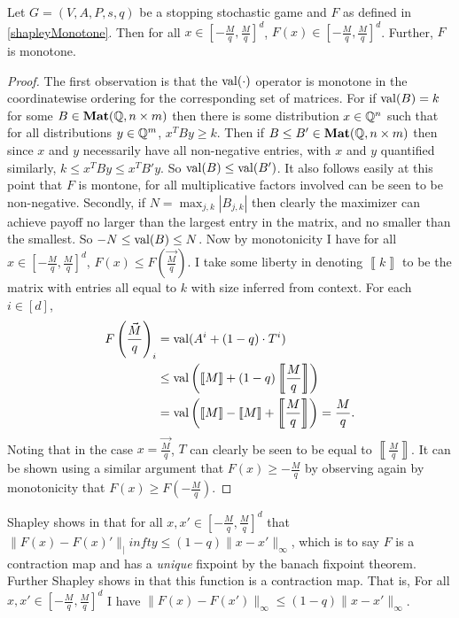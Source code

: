 \begin{lemma}
  Let $G = (V, A, P, s, q)$ be a stopping stochastic game and $F$ as defined in \cref{shapleyMonotone}.
  Then for all $x \in [-\frac{M}{q}, \frac{M}{q}]^d$, $F(x) \in [-\frac{M}{q}, \frac{M}{q}]^d$.
  Further, $F$ is monotone.
\end{lemma}
\newcommand{\mat}[1]{\left\llbracket #1 \right\rrbracket}
\begin{proof}
  The first observation is that the $\mathrm{val}(\cdot)$ operator is monotone in the coordinatewise ordering
  for the corresponding set of matrices. For
  if $\mathrm{val}(B) = k$ for some $B \in \mathbf{Mat}(\mathbb{Q}, n \times m)$ then there is some
  distribution $x \in \mathbb{Q}^n$ such that for all distributions $y \in \mathbb{Q}^m$, $x^T B y \geq k$.
  Then if $B \leq B' \in \mathbf{Mat}(\mathbb{Q}, n \times m)$ then since $x$ and $y$ necessarily have
  all non-negative entries, with $x$ and $y$ quantified similarly, $k \leq x^T B y \leq x^T B' y$. So $\mathrm{val}(B) \leq \mathrm{val}(B')$.
  It also follows easily at this point that $F$ is montone, for all multiplicative factors involved can be seen to be
  non-negative.
  Secondly, if $N = \max_{j, k} |B_{j, k}|$ then clearly the maximizer can achieve payoff
  no larger than the largest entry in the matrix, and no smaller than the smallest. So $-N \leq \mathrm{val}(B) \leq N$.
  Now by monotonicity I have for all $x \in [-\frac{M}{q}, \frac{M}{q}]^d$, $F(x) \leq F\left(\vec{\frac{M}{q}}\right)$.
  I take some liberty in denoting $\mat{k}$ to be the matrix
  with entries all equal to $k$ with size inferred from context. For each $i \in [d]$,
  \begin{align*}
    F\left(\vec{\frac{M}{q}}\right)_i &= \val(A^i + (1 - q) \cdot T^i) \\
                               &\leq \val\left(\mat{M} + (1 - q) \mat{\frac{M}{q}}\right) \\
                               &= \val\left(\mat{M} - \mat{M} + \mat{\frac{M}{q}}\right) = \frac{M}{q}.
  \end{align*}
  Noting that in the case $x = \vec{\frac{M}{q}}$, $T$ can clearly be seen to be equal to $\mat{\frac{M}{q}}$.
  It can be shown using a similar argument that $F(x) \geq -\frac{M}{q}$ by observing again by monotonicity
  that $F(x) \geq F\left(-\frac{M}{q}\right)$.
\end{proof}
Shapley shows in \citep{shapley} that for all $x, x' \in [-\frac{M}{q}, \frac{M}{q}]^d$ 
that $\|F(x) - F(x)'\|_|infty \leq (1 - q) \|x - x'\|_\infty$,
which is to say $F$ is a contraction map and has a \emph{unique} fixpoint by the banach fixpoint theorem. Further
Shapley shows in \citep{shapley} that this function is a contraction map. That is,
For all $x, x' \in [-\frac{M}{q}, \frac{M}{q}]^d$ I have $\|F(x) - F(x')\|_\infty \leq (1 - q) \|x - x'\|_\infty$.
